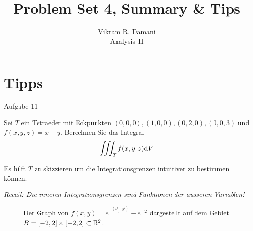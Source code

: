 \documentclass[12pt]{article}
\begin{document}
\title{\vspace*{-2.5em}Problem Set 4, Summary \& Tips}
\author{Vikram R. Damani\\
    Analysis~II}

\maketitle


\section{Tipps}

\begin{nexercise}{Aufgabe 1}{1}
    Sei $T$ ein Tetraeder mit Eckpunkten $(0,0,0), (1,0,0), (0,2,0), (0,0,3)$ und $f(x,y,z)=x+y$. Berechnen Sie das Integral
    \begin{align}
        \iiint_T f(x,y,z)\mathrm{d}V
    \end{align}
\end{nexercise}

\begin{tips}{1} Es hilft $T$ zu skizzieren um die Integrationsgrenzen intuitiver zu bestimmen können.

    \emph{Recall: Die inneren Integrationsgrenzen sind Funktionen der äusseren Variablen!}
\end{tips}\vspace*{1em}

\begin{figure}[htbp!]
    \centering
    \caption{Der Graph von $f(x,y)=e^{\frac{-(x^2+y^2)}{8}}-e^{-2}$ dargestellt auf dem Gebiet $B=[-2,2]\times[-2,2]\subset\mathbb{R}^2$.}
\end{figure}
\end{document}
